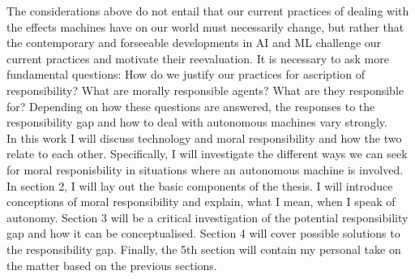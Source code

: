 \documentclass{article}
\begin{document}
The considerations above do not entail that our current practices of dealing
with the effects machines have on our world must necessarily change, but rather
that the contemporary and forseeable developments in AI and ML challenge our
current practices and motivate their reevaluation. It is necessary to ask more
fundamental questions: How do we justify our practices for ascription of
responsibility? What are morally responsible agents? What are they responsible
for? Depending on how these questions are answered, the responses to the
responsibility gap and how to deal with autonomous machines vary strongly.\\

In this work I will discuss technology and moral responsibility and how the two
relate to each other. Specifically, I will investigate the different ways we can seek
for moral responisbility in situations where an autonomous machine is involved.
In section 2, I will lay out the basic components of the thesis. I will
introduce conceptions of moral responsibility and explain, what I mean,
when I speak of autonomy. Section 3 will be a critical investigation of the potential
responsibility gap and how it can be conceptualised. Section 4 will cover
possible solutions to the responsibility gap. Finally, the 5th section will
contain my personal take on the matter based on the previous sections.
\end{document}
